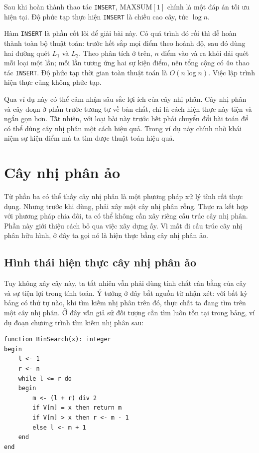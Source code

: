 \documentclass[11pt]{article}
\begin{document}
Sau khi hoàn thành thao tác \texttt{INSERT}, \(\mathrm{MAXSUM}[1]\) chính là
một đáp án tối ưu hiện tại. Độ phức tạp thực hiện \texttt{INSERT} là chiều cao
cây, tức \(\log n\).

Hàm \texttt{INSERT} là phần cốt lõi để giải bài này. Có quá trình đó rồi thì
dễ hoàn thành toàn bộ thuật toán: trước hết sắp mọi điểm theo hoành độ, sau đó
dùng hai đường quét \(L_1\) và \(L_2\). Theo phân tích ở trên, \(n\) điểm vào
và ra khỏi dải quét mỗi loại một lần; mỗi lần tương ứng hai sự kiện điểm, nên
tổng cộng có \(4n\) thao tác \texttt{INSERT}. Độ phức tạp thời gian toàn thuật
toán là \(O(n\log n)\). Việc lập trình hiện thực cũng không phức tạp.

Qua ví dụ này có thể cảm nhận sâu sắc lợi ích của cây nhị phân. Cây nhị phân
và cây đoạn ở phần trước tương tự về bản chất, chỉ là cách hiện thực này tiện
và ngắn gọn hơn. Tất nhiên, với loại bài này trước hết phải chuyển đổi bài
toán để có thể dùng cây nhị phân một cách hiệu quả. Trong ví dụ này chính nhờ
khái niệm sự kiện điểm mà ta tìm được thuật toán hiệu quả.

\section{Cây nhị phân ảo}

Từ phần ba có thể thấy cây nhị phân là một phương pháp xử lý tĩnh rất thực
dụng. Nhưng trước khi dùng, phải xây một cây nhị phân rỗng. Thực ra kết hợp
với phương pháp chia đôi, ta có thể không cần xây riêng cấu trúc cây nhị phân.
Phần này giới thiệu cách bỏ qua việc xây dựng ấy. Vì mất đi cấu trúc cây nhị
phân hữu hình, ở đây ta gọi nó là hiện thực bằng cây nhị phân ảo.

\subsection{Hình thái hiện thực cây nhị phân ảo}

Tuy không xây cây này, ta tất nhiên vẫn phải dùng tính chất cân bằng của cây
và sự tiện lợi trong tính toán. Ý tưởng ở đây bắt nguồn từ nhận xét: với bất
kỳ bảng có thứ tự nào, khi tìm kiếm nhị phân trên đó, thực chất ta đang tìm
trên một cây nhị phân. Ở đây vẫn giả sử đối tượng cần tìm luôn tồn tại trong
bảng, ví dụ đoạn chương trình tìm kiếm nhị phân sau:

\begin{verbatim}
function BinSearch(x): integer
begin
    l <- 1
    r <- n
    while l <= r do
    begin
        m <- (l + r) div 2
        if V[m] = x then return m
        if V[m] > x then r <- m - 1
        else l <- m + 1
    end
end
\end{verbatim}
\end{document}
